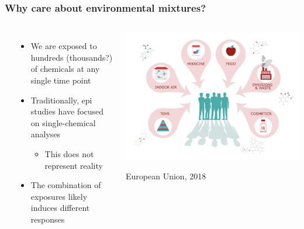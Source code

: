 \frame
{\frametitle{ Why care about environmental mixtures? }
\begin{columns}
\vspace{2ex} \\
    \begin{itemize}
        \item We are exposed to hundreds (thousands?) of chemicals at any single time point
        \item Traditionally, epi studies have focused on single-chemical analyses
        \begin{itemize}
            \item This does not represent reality
        \end{itemize}
        \item The {\color{matbluedark} combination} of exposures likely induces different responses 
    \end{itemize}
\begin{center}
\begin{changemargin}{-1.5em}{-1em}
	\includegraphics[scale=0.325]{figures/europa_image.png} \\
\end{changemargin}
\vspace{-1em}
\raggedleft
{\tiny\color{hgray}European Union, 2018}
\end{center}
\end{columns}
}

